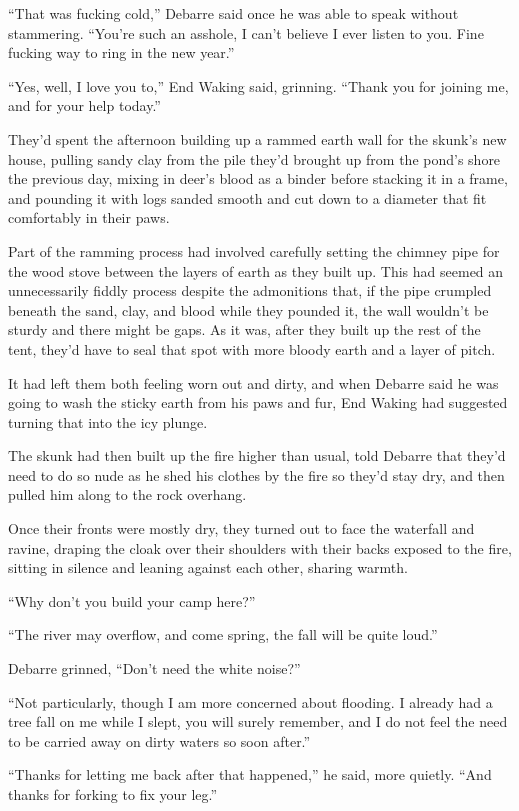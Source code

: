 ``That was fucking cold,'' Debarre said once he was able to speak without stammering. ``You're such an asshole, I can't believe I ever listen to you. Fine fucking way to ring in the new year.''

``Yes, well, I love you to,'' End Waking said, grinning. ``Thank you for joining me, and for your help today.''

They'd spent the afternoon building up a rammed earth wall for the skunk's new house, pulling sandy clay from the pile they'd brought up from the pond's shore the previous day, mixing in deer's blood as a binder before stacking it in a frame, and pounding it with logs sanded smooth and cut down to a diameter that fit comfortably in their paws.

Part of the ramming process had involved carefully setting the chimney pipe for the wood stove between the layers of earth as they built up. This had seemed an unnecessarily fiddly process despite the admonitions that, if the pipe crumpled beneath the sand, clay, and blood while they pounded it, the wall wouldn't be sturdy and there might be gaps. As it was, after they built up the rest of the tent, they'd have to seal that spot with more bloody earth and a layer of pitch.

It had left them both feeling worn out and dirty, and when Debarre said he was going to wash the sticky earth from his paws and fur, End Waking had suggested turning that into the icy plunge.

The skunk had then built up the fire higher than usual, told Debarre that they'd need to do so nude as he shed his clothes by the fire so they'd stay dry, and then pulled him along to the rock overhang.

Once their fronts were mostly dry, they turned out to face the waterfall and ravine, draping the cloak over their shoulders with their backs exposed to the fire, sitting in silence and leaning against each other, sharing warmth.

``Why don't you build your camp here?''

``The river may overflow, and come spring, the fall will be quite loud.''

Debarre grinned, ``Don't need the white noise?''

``Not particularly, though I am more concerned about flooding. I already had a tree fall on me while I slept, you will surely remember, and I do not feel the need to be carried away on dirty waters so soon after.''

``Thanks for letting me back after that happened,'' he said, more quietly. ``And thanks for forking to fix your leg.''

